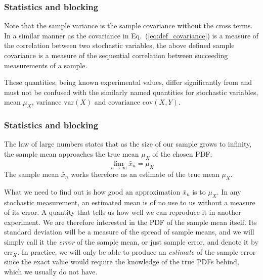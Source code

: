 \documentclass{beamer}
\begin{document}
\begin{frame}
\frametitle{Statistics and blocking}

\begin{block}{}
Note that the sample variance is the sample covariance without the
cross terms. In a similar manner as the covariance in Eq.~(\ref{eq:def_covariance}) is a measure of the correlation between
two stochastic variables, the above defined sample covariance is a
measure of the sequential correlation between succeeding measurements
of a sample.

These quantities, being known experimental values, differ
significantly from and must not be confused with the similarly named
quantities for stochastic variables, mean $\mu_X$, variance $\mathrm{var}(X)$
and covariance $\mathrm{cov}(X,Y)$.
\end{block}
\end{frame}

\begin{frame}
\frametitle{Statistics and blocking}

\begin{block}{}
The law of large numbers
states that as the size of our sample grows to infinity, the sample
mean approaches the true mean $\mu_X^{\phantom X}$ of the chosen PDF:
\[
\lim_{n\to\infty}\bar{x}_n = \mu_X^{\phantom X}
\]
The sample mean $\bar{x}_n$ works therefore as an estimate of the true
mean $\mu_X^{\phantom X}$.

What we need to find out is how good an approximation $\bar{x}_n$ is to
$\mu_X^{\phantom X}$. In any stochastic measurement, an estimated
mean is of no use to us without a measure of its error. A quantity
that tells us how well we can reproduce it in another experiment. We
are therefore interested in the PDF of the sample mean itself. Its
standard deviation will be a measure of the spread of sample means,
and we will simply call it the \emph{error} of the sample mean, or
just sample error, and denote it by $\mathrm{err}_X^{\phantom X}$. In
practice, we will only be able to produce an \emph{estimate} of the
sample error since the exact value would require the knowledge of the
true PDFs behind, which we usually do not have.
\end{block}
\end{frame}
\end{document}
